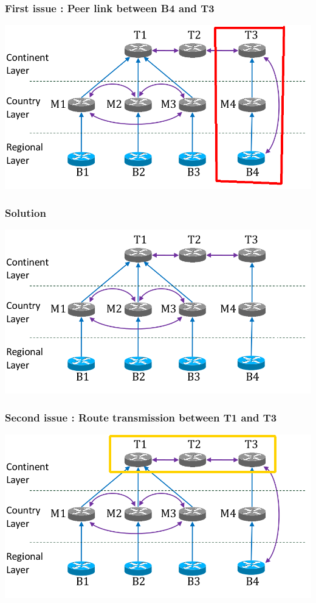 \documentclass[handout,usenames,dvipsnames]{beamer}
\begin{document}
\begin{frame}
\frametitle{First issue : Peer link between B4 and T3}
\includegraphics[scale=0.35]{first_issue.png}
\end{frame}

\begin{frame}
\frametitle{Solution}
\includegraphics[scale=0.35]{solutions1.png}
\end{frame}

\begin{frame}
\frametitle{Second issue : Route transmission between T1 and T3}
\includegraphics[scale=0.35]{second_issue.png}
\end{frame}
\end{document}
